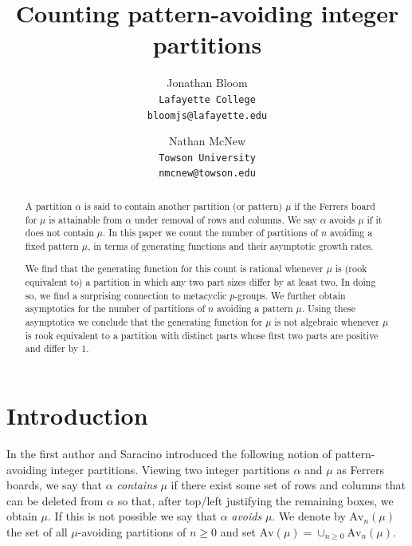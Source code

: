 \documentclass{article}
\theoremstyle{plain}
\theoremstyle{definition}
\newcommand{\Av}{\text{Av}}
\begin{document}
\title{Counting pattern-avoiding integer partitions}
 

\author{
  Jonathan Bloom\\
  \texttt{Lafayette College}\\
  \texttt{bloomjs@lafayette.edu}\\
  \and 
  Nathan McNew\\
    \texttt{Towson University}\\
    \texttt{nmcnew@towson.edu}
}
\date{\vspace{-3ex}}

\maketitle
\begin{abstract}
A partition $\alpha$ is said to contain another partition (or pattern) $\mu$ if the Ferrers board for $\mu$ is attainable from $\alpha$ under removal of rows and columns. We say $\alpha$ avoids $\mu$ if it does not contain $\mu$.  In this paper we count the number of partitions of $n$ avoiding a fixed pattern $\mu$, in terms of generating functions and their asymptotic growth rates.  

We find that the generating function for this count is rational whenever $\mu$ is (rook equivalent to) a partition in which any two part sizes differ by at least two.  In doing so, we find a surprising connection to metacyclic $p$-groups.  We further obtain asymptotics for the number of partitions of $n$ avoiding a pattern $\mu$.  Using these asymptotics we conclude that the generating function for $\mu$ is not algebraic whenever $\mu$ is rook equivalent to a partition with distinct parts whose first two parts are positive and differ by 1.  
\end{abstract}


\maketitle




\section{Introduction}\label{sec:intro}
In \cite{Bloom:Rook-2018} the first author and Saracino introduced the following notion of pattern-avoiding integer partitions.  
Viewing two integer partitions $\alpha$ and $\mu$ as Ferrers boards, we say that $\alpha$ \emph{contains} $\mu$ if there exist some set of rows and columns that can be deleted from $\alpha$ so that, after top/left justifying the remaining boxes, we obtain $\mu$. If this is not possible we say that $\alpha$ \emph{avoids} $\mu$.  We denote by $\Av_n(\mu)$ the set of all $\mu$-avoiding partitions of $n\geq 0$ and set $\Av(\mu) = \cup_{n\geq 0}\Av_n(\mu)$.  
\end{document}

